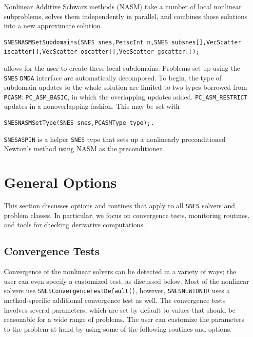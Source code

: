 Nonlinear Additive Schwarz methods (NASM) take a number of local nonlinear
subproblems, solves them independently in parallel, and combines those solutions
into a new approximate solution.
\begin{lstlisting}
SNESNASMSetSubdomains(SNES snes,PetscInt n,SNES subsnes[],VecScatter iscatter[],VecScatter oscatter[],VecScatter gscatter[]);
\end{lstlisting}
 allows for the user to create these local subdomains.  Problems set up using the \lstinline{SNES} \lstinline{DMDA} interface are automatically
decomposed.  To begin, the type of subdomain updates to the whole solution are limited to two types borrowed from
\lstinline{PCASM}: \lstinline{PC_ASM_BASIC}, in which the overlapping updates added.  \lstinline{PC_ASM_RESTRICT} updates in a nonoverlapping
fashion.  This may be set with
\begin{lstlisting}
SNESNASMSetType(SNES snes,PCASMType type);.
\end{lstlisting}
\lstinline{SNESASPIN} is a helper \lstinline{SNES} type that sets up a nonlinearly preconditioned Newton's
method using NASM as the preconditioner.

\section{General Options}

This section discusses options and routines that apply to all \lstinline{SNES}
solvers and problem classes.  In particular, we focus on convergence
tests, monitoring routines, and tools for checking derivative
computations.

\subsection{Convergence Tests}
\label{sec_snesconvergence}

Convergence of the nonlinear solvers can be detected in a variety of ways; the
user can even specify a customized test, as discussed below.  Most of the nonlinear solvers use \lstinline{SNESConvergenceTestDefault()}, however,
\lstinline{SNESNEWTONTR} uses a method-specific additional convergence test as well.  The
 convergence tests involves several parameters, which are set by default
to values that should be reasonable for a wide range of problems.  The user can
customize the parameters to the problem at hand by using some of the following
routines and options.

